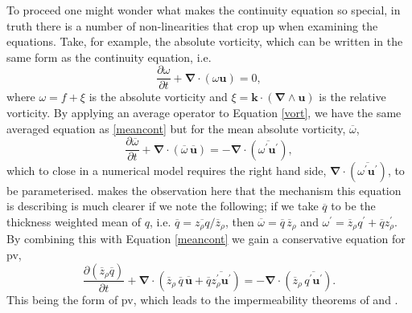 \documentclass[10pt,a4paper]{article}
\newcommand*\mean[1]{\overline{#1}}
\newcommand*\res[1]{{#1}^{\prime}}
\begin{document}
         To proceed one might wonder what makes the continuity equation
         so special, in truth there is a number of non-linearities that
         crop up when examining the equations. Take, for example, the
         absolute vorticity, which can be written in the same form as the continuity equation, i.e.
           \begin{equation}
           \frac{\partial \omega}{\partial t} + \boldsymbol{\nabla}\cdot\left(\omega\boldsymbol{u}\right) = 0,
           \label{vort}
           \end{equation}
           where $\omega=f+\xi$ is the absolute vorticity and
           $\xi = \boldsymbol{k} \cdot\left( \boldsymbol{\nabla}\wedge \boldsymbol{u}\right)$ is the relative vorticity. 
           By applying an average operator to Equation \ref{vort}, we have the same averaged equation as \ref{meancont} but for the mean absolute vorticity, $\mean{\omega}$,
                \begin{equation}
                \frac{\partial \mean{\omega}}{\partial t} + \boldsymbol{\nabla}\cdot\left(\mean{\omega} \, \mean{\boldsymbol{u}}\right) = - \boldsymbol{\nabla}\cdot\left(\mean{\res{\omega} \res{\boldsymbol{u}}}\right),
                \end{equation}
                which to close in a numerical model requires the
                right hand side, $ \boldsymbol{\nabla}\cdot\left(\mean{\res{\omega} \res{\boldsymbol{u}}}\right)$, to be parameterised.
                \cite{greatbatch1998exploring} makes the observation
                here that the mechanism this equation is describing 
                is much clearer if we note the following; if we take
                $\mean{q}$ to be the thickness weighted mean of $q$, i.e.
                $\mean{q}=\mean{z_{\rho}q}/\mean{z}_{\rho}$, then 
                $\mean{\omega}=\mean{q}\,\mean{z}_{\rho}$ and $\res{\omega}=\mean{z}_{\rho}\res{q}+\mean{q}\res{z}_{\rho}$. By 
                combining this with Equation \ref{meancont} we gain a conservative equation 
                for \gls{pv}, 
                \begin{equation}
                \frac{\partial \left(\mean{z}_{\rho} \mean{q}\right)}{\partial t} +
                 \boldsymbol{\nabla}\cdot\left(\mean{z}_{\rho}\,\mean{q}\,\mean{\boldsymbol{u}}+\mean{q}\mean{\res{z}_{\rho} \res{\boldsymbol{u}}}\right)
                 = - \boldsymbol{\nabla}\cdot\left(\mean{z}_{\rho}\,\mean{\res{q} \res{\boldsymbol{u}}}\right) .
                 \label{meanpveq}
                \end{equation}
                This being the form of \gls{pv}, which leads to the impermeability theorems
                of \cite{haynes1987evolution} and \cite{haynes1990conservation}.
                
\end{document}
